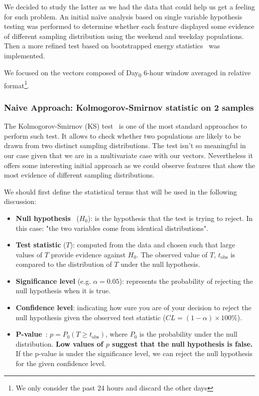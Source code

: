 We decided to study the latter as we had the data that could help us get a feeling for such problem. An initial naïve analysis based on single variable hypothesis testing was performed to determine whether each feature displayed some evidence of different sampling distribution using the weekend and weekday populations. Then a more refined test based on bootstrapped energy statistics~\cite{energy_test} was implemented. 

We focused on the vectors composed of Day\textsubscript{0} 6-hour window averaged in relative format\footnote{We only consider the past 24 hours and discard the other days}.

\subsubsection{Naive Approach: Kolmogorov-Smirnov statistic on 2 samples}
The Kolmogorov-Smirnov (KS) test~\cite{wiki:ks_test} is one of the most standard approaches to perform such test. It allows to check whether two populations are likely to be drawn from two distinct sampling distributions. The test isn't so meaningful in our case given that we are in a multivariate case with our vectors. Nevertheless it offers some interesting initial approach as we could observe features that show the most evidence of different sampling distributions.

We should first define the statistical terms that will be used in the following discussion:
\begin{itemize}[noitemsep,topsep=0pt]
	\item \textbf{Null hypothesis}~\cite{wiki:null_hyp} ($H_0$): is the hypothesis that the test is trying to reject. In this case: "the two variables come from identical distributions".
	\item \textbf{Test statistic} ($T$): computed from the data and chosen such that large values of $T$ provide evidence against $H_0$. The observed value of $T$, $t_\text{obs}$ is compared to the distribution of $T$ under the null hypothesis. 
	\item \textbf{Significance level} (e.g. $\alpha = 0.05$): represents the probability of rejecting the null hypothesis when it is true. 
	\item \textbf{Confidence level}: indicating how sure you are of your decision to reject the null hypothesis given the observed test statistic ($CL = (1 -\alpha)\times 100\%$).
	\item \textbf{P-value}~\cite{wiki:pvalue}: $p=P_0(T \ge t_\text{obs})$, where $P_0$ is the probability under the null distribution. \textbf{Low values of $p$ suggest that the null hypothesis is false.} If the p-value is under the significance level, we can reject the null hypothesis for the given confidence level.
\end{itemize}

